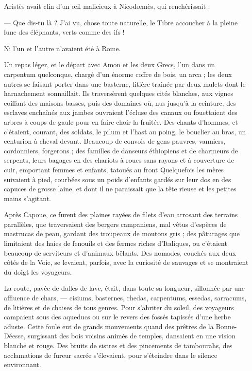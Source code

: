 \documentclass[a4paper, 11pt, oneside, polutonikogreek, french]{article}
\begin{document}
Aristès avait clin d'un œil malicieux à Nicodœmès, qui renchérissait :

--- Que dis-tu là ? J'ai vu, chose toute naturelle, le Tibre accoucher à la pleine lune des éléphants, verts comme des ifs !

Ni l'un et l'autre n'avaient été à Rome.

Un repas léger, et le départ avec Amon et les deux Grecs, l'un dans un carpentum quelconque, chargé d'un énorme coffre de bois, un arca ; les deux autres se faisant porter dans une basterne, litière traînée par deux mulets dont le harnachement sonnaillait. Ils traversèrent quelques cités blanches, aux vignes coiffant des maisons basses, puis des domaines où, nus jusqu'à la ceinture, des esclaves enchaînés aux jambes ouvraient l'écluse des canaux ou fouettaient des arbres à coups de gaule pour en faire choir la fruitée. Des chants d'hommes, et c'étaient, courant, des soldats, le pilum et l'hast au poing, le bouclier au bras, un centurion à cheval devant. Beaucoup de convois de gens pauvres, vanniers, cordonniers, forgerons ; des familles de danseurs éthiopiens et de charmeurs de serpents, leurs bagages en des chariots à roues sans rayons et à couverture de cuir, emportant femmes et enfants, tatoués au front Quelquefois les mères suivaient à pied, courbées sous un poids d'enfants gardés sur leur dos en des capuces de grosse laine, et dont il ne paraissait que la tête rieuse et les petites mains s'agitant.

Après Capoue, ce furent des plaines rayées de filets d'eau arrosant des terrains parallèles, que traversaient des bergers campaniens, mal vêtus d'espèces de mastrucas de peau, gardant des troupeaux de moutons gris ; des pâturages que limitaient des haies de fenouils et des fermes riches d'Italiques, ou c'étaient beaucoup de serviteurs et d'animaux bêlants. Des nomades, couchés aux deux côtés de la Voie, se levaient, parfois, avec la curiosité de sauvages et se montraient du doigt les voyageurs.

La route, pavée de dalles de lave, était, dans toute sa longueur, sillonnée par une affluence de chars, --- cisiums, basternes, rhedas, carpentums, essedas, sarracums, de litières et de chaises de tous genres. Pour s'abriter du soleil, des voyageurs campaient sous des aqueducs ou sur le revers des fossés tapissés d'une herbe aduste. Cette foule eut de grands mouvements quand des prêtres de la Bonne-Déesse, surgissant des bois voisins animés de temples, dansaient en une vision blanche et rouge. Des bruits de sistres et des pincements de tambourahs, des acclamations de fureur sacrée s'élevaient, pour s'éteindre dans le silence environnant.
\end{document}
